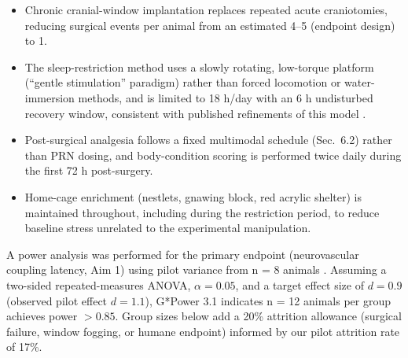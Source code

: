 \vspace{6pt}

\begin{tcolorbox}[narrbox={3.3 Refinement --- Minimizing pain, distress, and adverse impact}]
\begin{itemize}
  \item Chronic cranial-window implantation replaces repeated acute craniotomies, reducing
    surgical events per animal from an estimated 4--5 (endpoint design) to 1.
  \item The sleep-restriction method uses a slowly rotating, low-torque platform (``gentle
    stimulation'' paradigm) rather than forced locomotion or water-immersion methods, and is
    limited to 18 h/day with an 6 h undisturbed recovery window, consistent with published
    refinements of this model \cite{walker2017sleep}.
  \item Post-surgical analgesia follows a fixed multimodal schedule (Sec.\ 6.2) rather than
    PRN dosing, and body-condition scoring is performed twice daily during the first
    72 h post-surgery.
  \item Home-cage enrichment (nestlets, gnawing block, red acrylic shelter) is maintained
    throughout, including during the restriction period, to reduce baseline stress unrelated
    to the experimental manipulation.
\end{itemize}
\end{tcolorbox}

\vspace{8pt}

A power analysis was performed for the primary endpoint (neurovascular coupling latency,
Aim 1) using pilot variance from n = 8 animals \cite{lindqvist2024cortical}. Assuming a
two-sided repeated-measures ANOVA, $\alpha = 0.05$, and a target effect size of
$d = 0.9$ (observed pilot effect $d = 1.1$), G*Power 3.1 indicates n = 12 animals per group
achieves power $> 0.85$. Group sizes below add a 20\% attrition allowance (surgical failure,
window fogging, or humane endpoint) informed by our pilot attrition rate of 17\%.

